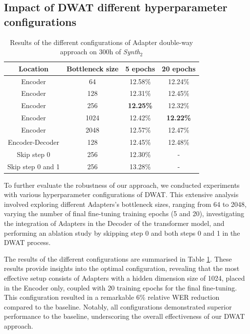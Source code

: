 \subsection{Impact of DWAT different hyperparameter configurations}
\label{sec:hyperparameter}
\begin{table}[t]
\centering
\begin{tabular}{cccc}
\hline
 Location &  Bottleneck size &  5 epochs &  20 epochs     \\ \hline
\multicolumn{1}{c}{Encoder} & 64 & 12.58\% & 12.24\% \\ 
\multicolumn{1}{c}{Encoder} & 128 &  12.31\% & 12.45\%  \\ 
\multicolumn{1}{c}{Encoder} & 256  & \textbf{12.25\%} & 12.32\%  \\ 
\multicolumn{1}{c}{Encoder} & 1024 & 12.42\% & \textbf{12.22\%} \\ 
\multicolumn{1}{c}{Encoder} & 2048 & 12.57\% & 12.47\% \\ \hline
\multicolumn{1}{c}{Encoder-Decoder} & 128 & 12.45\% & 12.48\% \\ \hline
\multicolumn{1}{c}{Skip step 0} & 256 & 12.30\% & - \\ 
\multicolumn{1}{c}{Skip step 0 and 1} & 256 & 13.28\% & - \\ \hline

\end{tabular}

\caption{Results of the different configurations of Adapter double-way approach on 300h of \textit{Synth$_2$}}
\label{tab:config_hparams}
\end{table}
To further evaluate the robustness of our approach, we conducted experiments with various hyperparameter configurations of \ac{DWAT}. This extensive analysis involved exploring different Adapters's bottleneck sizes, ranging from 64 to 2048, varying the number of final fine-tuning training epochs (5 and 20), investigating the integration of Adapters in the Decoder of the transformer model, and performing an ablation study by skipping step 0 and both steps 0 and 1 in the \ac{DWAT} process.

The results of the different configurations are summarised in Table \ref{tab:config_hparams}. These results provide insights into the optimal configuration, revealing that the most effective setup consists of  Adapters with a hidden dimension size of 1024, placed in the Encoder only, coupled with 20 training epochs for the final fine-tuning. This configuration resulted in a remarkable 6\% relative \ac{WER} reduction compared to the baseline. Notably, all configurations demonstrated superior performance to the baseline, underscoring the overall effectiveness of our \ac{DWAT} approach.

